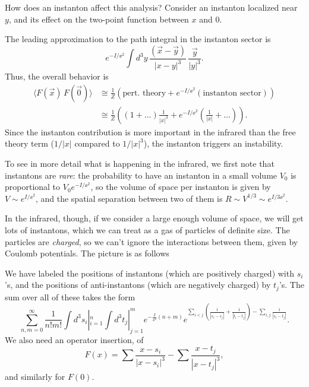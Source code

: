 How does an instanton affect this analysis?  Consider an instanton localized
near $y$, and its effect on the two-point function between $x$ and $0$.

\epsfxsize=4in
\centerline{}

\noindent
The leading approximation to the path integral in the instanton sector is
\begin{equation}
e^{-I/\ee^2}\int d^3y\,\frac{(\vec{x}-\vec{y})}{|x-y|^3}\,
\frac{\vec{y}}{|y|^3}.
\end{equation}
Thus, the overall behavior is
\begin{equation}
\begin{align}
\langle F(\vec{x})\,F(\vec{0})\rangle
&\cong
\frac1{Z}\left(\text{pert. theory} + e^{-I/\ee^2}(\text{instanton
sector})\right)
\\&\cong
\frac1{Z}\left((1+\dots)\frac1{|x|^3}+e^{-I/\ee^2}(\frac1{|x|}+\dots)\right).
\end{align}
\end{equation}
Since the instanton contribution is more important in the infrared than the
free theory term ($1/|x|$ compared to $1/|x|^3$),
the instanton triggers an instability.

To see in more detail what is happening in the infrared, we first note that
instantons are {\it rare}: the probability to have an instanton in
a small volume $V_0$ is proportional to $V_0e^{-I/\ee^2}$, so
the volume of space per
 instanton is given by $V\sim
e^{I/\ee^2}$, and  the spatial separation between two of them is $R\sim
{V}^{1/3}\sim e^{I/3\ee^2}$.

In the infrared, though, if we consider a large enough volume of space,
we will get lots of instantons, which we can treat as
a gas of particles of definite size.  The particles are {\it charged}, so
we can't ignore the interactions between them, given by Coulomb potentials.
The picture is as follows

\epsfxsize=3in
\centerline{}

\noindent
We have labeled the positions of instantons (which are positively charged) with
$s_i$'s, and the positions of anti-instantons (which are negatively charged) by
$t_j$'s.  The sum over all of these takes the form
\begin{equation}
\sum_{n,m=0}^\infty \frac1{n!m!}\int d^3s_i|_{i=1}^{n}
\int d^3t_j|_{j=1}^{m} e^{-\frac{I}{\ee^2}(n+m)}
e^{
\sum_{i<j}\left(\frac1{|s_i-s_j|}+\frac1{|t_i-t_j|}\right)
-\sum_{i,j}\frac1{|s_i-t_j|}
}.
\end{equation}
We also need an operator insertion, of
\begin{equation}
F(x)=\sum \frac{x-s_i}{|x-s_i|^3}-\sum \frac{x-t_j}{|x-t_j|^3},
\end{equation}
and similarly for $F(0)$.


